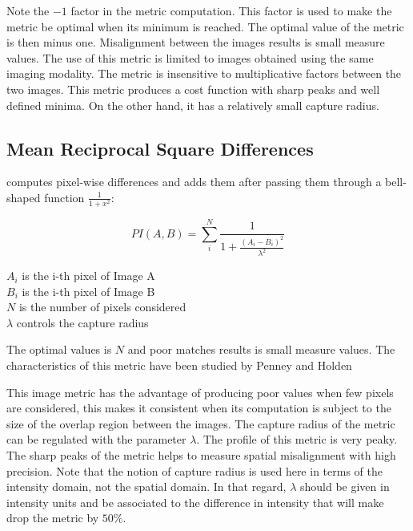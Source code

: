 Note the $-1$ factor in the metric computation. This factor is used to make the
metric be optimal when its minimum is reached.  The optimal value of the metric
is then minus one. Misalignment between the images results is small measure
values.  The use of this metric is limited to images obtained using the same
imaging modality.  The metric is insensitive to multiplicative factors between
the two images.  This metric produces a cost function with sharp peaks and well
defined minima.  On the other hand, it has a relatively small capture radius.

\subsection{Mean Reciprocal Square Differences}
\label{sec:MeanReciprocalSquareDifferenceMetric}
 computes pixel-wise differences and adds them 
after passing them through a bell-shaped function $\frac{1}{1+x^2}$:

\begin{equation}
PI(A,B) =  \sum_i^N \frac{ 1 }{ 1 + \frac{ \left( A_i - B_i \right) ^ 2}{ \lambda^2 }  }
\end{equation}
\begin{center}
$A_i$ is the i-th pixel of Image A \\
$B_i$ is the i-th pixel of Image B \\
$N$ is the number of pixels considered \\
$\lambda$ controls the capture radius
\end{center}

The optimal values is $N$ and poor matches results is small measure values.
The characteristics of this metric have been studied by Penney and Holden
\cite{Holden1999}\cite{Penney1998}

This image metric has the advantage of producing poor values when few pixels
are considered, this makes it consistent when its computation is subject to the
size of the overlap region between the images. The capture radius of the
metric can be regulated with the parameter $\lambda$.  The profile of this
metric is very peaky. The sharp peaks of the metric helps to measure spatial
misalignment with high precision. Note that the notion of capture radius is
used here in terms of the intensity domain, not the spatial domain. In that
regard, $\lambda$ should be given in intensity units and be associated to the
difference in intensity that will make drop the metric by $50\%$.


